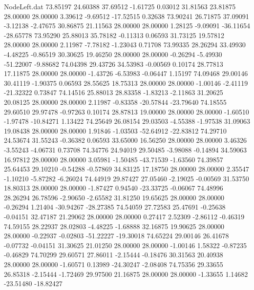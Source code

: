\begin{filecontents}{NodeLeft.dat}
  73.85197   24.60388   37.69512    -1.61725    0.03012   31.81563   23.81875   28.00000   28.00000    3.39612   -9.69512  -17.52515    0.32638
  73.90241   26.71875   37.09091    -3.12138   -2.47675   30.86875   21.11563   28.00000   28.00000    1.28125   -9.09091  -36.11654  -28.65778
  73.95290   25.88013   35.78182    -0.11313    0.06593   31.73125   19.57812   28.00000   28.00000    2.11987   -7.78182   -1.23043    0.71708
  73.99335   28.26294   33.49930    -4.48225   -0.86519   30.30625   19.46250   28.00000   28.00000   -0.26294   -5.49930  -51.22007   -9.88682
  74.04398   29.43726   34.53983    -0.00569    0.10174   28.77813   17.11875   28.00000   28.00000   -1.43726   -6.53983   -0.06447    1.15197
  74.09468   29.00146   30.41119    -1.90375    0.06593   28.55625   18.75313   28.00000   28.00000   -1.00146   -2.41119  -21.32322    0.73847
  74.14516   25.88013   28.83358    -1.83213   -2.11863   31.20625   20.08125   28.00000   28.00000    2.11987   -0.83358  -20.57844  -23.79640
  74.18555   29.60510   29.97478    -0.97263    0.10174   28.87813   19.00000   28.00000   28.00000   -1.60510   -1.97478  -10.84271    1.13422
  74.25649   26.08154   29.03503    -4.55388   -1.97538   31.09063   19.08438   28.00000   28.00000    1.91846   -1.03503  -52.64912  -22.83812
  74.29710   24.53674   31.55243    -0.36382    0.06593   33.65000   16.56250   28.00000   28.00000    3.46326   -3.55243   -4.06731    0.73708
  74.34776   24.94019   29.50485    -3.98088   -0.14894   34.59063   16.97812   28.00000   28.00000    3.05981   -1.50485  -43.71539   -1.63560
  74.39857   25.64453   29.10210    -0.54288   -0.57869   34.83125   17.18750   28.00000   28.00000    2.35547   -1.10210   -5.87282   -6.26024
  74.44919   29.87427   27.05460    -2.19025   -0.00569   31.53750   18.80313   28.00000   28.00000   -1.87427    0.94540  -23.33725   -0.06067
  74.48996   28.26294   26.78596    -2.90650   -2.65582   31.81250   19.65625   28.00000   28.00000   -0.26294    1.21404  -30.94267  -28.27385
  74.54059   27.72583   25.47691    -0.25638   -0.04151   32.47187   21.29062   28.00000   28.00000    0.27417    2.52309   -2.86112   -0.46319
  74.59155   28.22937   28.02803    -4.48225   -1.68888   32.16875   19.90625   28.00000   28.00000   -0.22937   -0.02803  -51.22227  -19.30018
  74.65224   29.00146   26.41678    -0.07732   -0.04151   31.30625   21.01250   28.00000   28.00000   -1.00146    1.58322   -0.87235   -0.46829
  74.70299   29.60571   27.86011    -2.15444   -0.18476   30.31563   20.40938   28.00000   28.00000   -1.60571    0.13989  -24.30247   -2.08408
  74.75356   29.33655   26.85318    -2.15444   -1.72469   29.97500   21.16875   28.00000   28.00000   -1.33655    1.14682  -23.51480  -18.82427

\end{filecontents}
